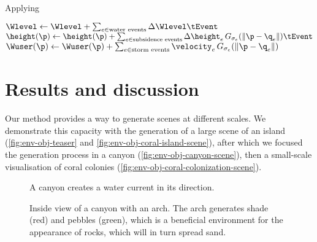 \begin{algorithm}%
    \DontPrintSemicolon
    \caption{Applying }
    \label{alg:env-obj-geoevents}
    \BlankLine
    $\Wlevel \gets \Wlevel + \sum_{e \in \text{water events}} \Delta \Wlevel \tEvent$\;
    $\height(\p) \gets \height(\p) + \sum_{e \in \text{subsidence events}} \Delta \height_e\, G_{\sigma_e}(\|\p-\q_e\|)\tEvent$\;
    $\Wuser(\p) \gets \Wuser(\p) + \sum_{e \in \text{storm events}} \velocity_e \, G_{\sigma_e}(\|\p-\q_e\|)$\;
    \Return{$\height,\Wlevel,\Wuser$}
\end{algorithm}



\section{Results and discussion}
\label{sec:env-obj-results}
Our method provides a way to generate scenes at different scales. We demonstrate this capacity with the generation of a large scene of an island (\cref{fig:env-obj-teaser} and \cref{fig:env-obj-coral-island-scene}), after which we focused the generation process in a canyon (\cref{fig:env-obj-canyon-scene}), then a small-scale visualisation of coral colonies (\cref{fig:env-obj-coral-colonization-scene}).

\begin{figure}
    \caption{A canyon creates a water current in its direction.}
    \label{fig:env-obj-canyon-flow}
\end{figure}

\begin{figure}
    \caption{Inside view of a canyon with an arch. The arch generates shade (red) and pebbles (green), which is a beneficial environment for the appearance of rocks, which will in turn spread sand.}
    \label{fig:env-obj-canyon-inside-with-arch}
\end{figure}

